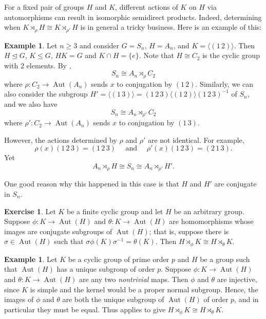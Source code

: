 \documentclass[12pt]{report}
\numberwithin{equation}{section}
\numberwithin{theorem}{chapter}
\theoremstyle{definition}
\newtheorem{example}[theorem]{Example}
\newtheorem{exercise}{Exercise}
\newtheorem*{basic properties}{Basic Properties}
\newtheorem*{Important Remark}{Important Remark}
\def\sdp{\rtimes}
\DeclareMathOperator{\Aut}{Aut}
\def\norm{\mathrel{\unlhd}}
\begin{document}
For a fixed pair of groups $H$ and $K$, different actions of $K$ on $H$ via automorphisms can result in isomorphic semidirect products. Indeed, determining when $K \sdp_{\rho} H \cong K \sdp_{\rho'} H$ is in general a tricky business. Here is an example of this:

\begin{example}
Let $n \geqslant 3$ and consider $G = S_n$, $H = A_n$, and $K = \langle (1 \, 2) \rangle$. Then $H \norm G$, $K \leq G$, $HK = G$ and $K \cap H  = \{e\}$. Note that $H \cong C_2$ is the cyclic group with $2$ elements. 
By ,
$$S_n \cong A_n \sdp_\rho C_2$$
where $\rho\!: C_2 \longrightarrow \Aut(A_n)$ sends $x$ to conjugation by $(1 \, 2)$. 
Similarly, we can also consider the subgroup $H' = \langle (1 \, 3) \rangle = (1 \,2 \, 3) \langle (1 \, 2) \rangle (1 \,2 \, 3)^{-1}$ of $S_n$, and we also have
$$S_n \cong A_n \sdp_{\rho'} C_2$$
where $\rho': C_2 \to \Aut(A_n)$ sends $x$ to conjugation by $(1 \,3)$.

However, the actions determined by $\rho$ and $\rho'$ are not identical. For example, 
$$\rho(x)(1 \, 2 \, 3) = (1 \, 2 \, 3) \quad \text{ and } \quad \rho'(x)(1 \, 2 \, 3 ) = (2 \, 1 \, 3).$$
Yet 
$$A_n \sdp_{\rho} H \cong S_n \cong A_n \sdp_{\rho'} H'.$$
\end{example}

One good reason why this happened in this case is that $H$ and $H'$ are conjugate in $S_n$.



\begin{exercise}\label{semidirect product iso if conjugate}
Let $K$ be a finite cyclic group and let $H$ be an arbitrary group. Suppose $\phi\!: K \to \Aut(H)$ and $\theta\!: K \to \Aut(H)$ are homomorphisms whose images are conjugate subgroups of $\Aut(H)$; that is, suppose there is $\sigma \in \Aut(H)$ such that $\sigma \phi(K) \sigma^{-1} = \theta(K)$. Then $H \sdp_\phi K \cong H \sdp_\theta K$. 
\end{exercise}


\begin{example}
Let $K$ be a cyclic group of prime order $p$ and $H$ be a group such that $\Aut(H)$ has a unique subgroup of order $p$. Suppose $\phi\!: K \to \Aut(H)$ and $\theta\!: K \to \Aut(H)$ are any two {\em nontrivial} maps. Then $\phi$ and $\theta$ are injective, since $K$ is simple and the kernel would be a proper normal subgroup. Hence, the images of $\phi$ and $\theta$ are both the unique subgroup of $\Aut(H)$ of order $p$, and in particular they must be equal. Thus  applies to give $H \sdp_\phi K \cong H \sdp_\theta K$.
\end{example}
\end{document}

